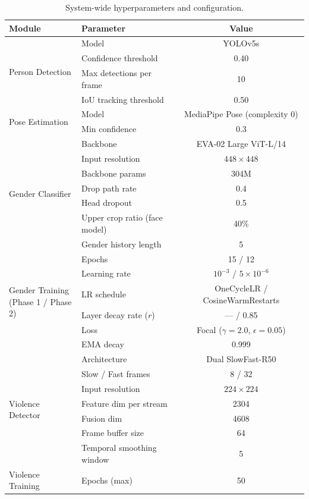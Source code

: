 \documentclass[11pt,a4paper]{article}
\begin{document}
\begin{table}[H]
\centering
\caption{System-wide hyperparameters and configuration.}
\label{tab:hyperparams}
\small
\begin{tabular}{@{}llc@{}}
\toprule
\textbf{Module} & \textbf{Parameter} & \textbf{Value} \\
\midrule
\multirow{4}{*}{Person Detection} & Model & YOLOv5s \\
& Confidence threshold & 0.40 \\
& Max detections per frame & 10 \\
& IoU tracking threshold & 0.50 \\
\midrule
\multirow{2}{*}{Pose Estimation} & Model & MediaPipe Pose (complexity 0) \\
& Min confidence & 0.3 \\
\midrule
\multirow{7}{*}{Gender Classifier} & Backbone & EVA-02 Large ViT-L/14 \\
& Input resolution & $448 \times 448$ \\
& Backbone params & 304M \\
& Drop path rate & 0.4 \\
& Head dropout & 0.5 \\
& Upper crop ratio (face model) & 40\% \\
& Gender history length & 5 \\
\midrule
\multirow{6}{*}{\parbox{3cm}{Gender Training\\(Phase 1 / Phase 2)}} & Epochs & 15 / 12 \\
& Learning rate & $10^{-3}$ / $5\!\times\!10^{-6}$ \\
& LR schedule & OneCycleLR / CosineWarmRestarts \\
& Layer decay rate ($r$) & --- / 0.85 \\
& Loss & Focal ($\gamma\!=\!2.0$, $\epsilon\!=\!0.05$) \\
& EMA decay & 0.999 \\
\midrule
\multirow{7}{*}{Violence Detector} & Architecture & Dual SlowFast-R50 \\
& Slow / Fast frames & 8 / 32 \\
& Input resolution & $224 \times 224$ \\
& Feature dim per stream & 2304 \\
& Fusion dim & 4608 \\
& Frame buffer size & 64 \\
& Temporal smoothing window & 5 \\
\midrule
\multirow{5}{*}{\parbox{3cm}{Violence Training}} & Epochs (max) & 50 \\

\end{tabular}
\end{table}
\end{document}
